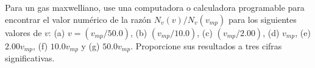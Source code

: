 \item Para un gas maxwelliano, use una computadora o calculadora programable para encontrar el valor numérico de la razón $N_v(v)/N_v(v_{mp})$ para los siguientes valores de $v$: (a) $v = (v_{mp}/50.0)$, (b) $(v_{mp}/10.0)$, (c) $(v_{mp}/2.00)$, (d) $v_{mp}$, (e) $2.00v_{mp}$, (f) $10.0v_{mp}$ y (g) $50.0v_{mp}$. Proporcione sus resultados a tres cifras significativas.
